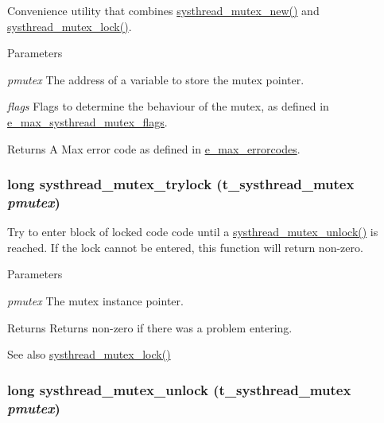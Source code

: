 Convenience utility that combines \hyperlink{group__mutex_gaa8cae78764c59883566ac4f861dd534e}{systhread\_\-mutex\_\-new()} and \hyperlink{group__mutex_ga6a3bea4c2f5e5d133d25d78b51fb15bf}{systhread\_\-mutex\_\-lock()}. 
\begin{DoxyParams}{Parameters}
\item[{\em pmutex}]The address of a variable to store the mutex pointer. \item[{\em flags}]Flags to determine the behaviour of the mutex, as defined in \hyperlink{group__threading_gaa95d9c538a1b25404d19106739db9802}{e\_\-max\_\-systhread\_\-mutex\_\-flags}. \end{DoxyParams}
\begin{DoxyReturn}{Returns}
A Max error code as defined in \hyperlink{group__misc_ga0764dd6c02b76cca7d053ae50555d69d}{e\_\-max\_\-errorcodes}. 
\end{DoxyReturn}
\hypertarget{group__mutex_gafa0cef91ad29e8e0625d35eadde52002}{
\subsubsection[{systhread\_\-mutex\_\-trylock}]{\setlength{\rightskip}{0pt plus 5cm}long systhread\_\-mutex\_\-trylock ({\bf t\_\-systhread\_\-mutex} {\em pmutex})}}
\label{group__mutex_gafa0cef91ad29e8e0625d35eadde52002}


Try to enter block of locked code code until a \hyperlink{group__mutex_ga74aae707e650844be8a4e51a217c9b5f}{systhread\_\-mutex\_\-unlock()} is reached. If the lock cannot be entered, this function will return non-\/zero.


\begin{DoxyParams}{Parameters}
\item[{\em pmutex}]The mutex instance pointer. \end{DoxyParams}
\begin{DoxyReturn}{Returns}
Returns non-\/zero if there was a problem entering. 
\end{DoxyReturn}
\begin{DoxySeeAlso}{See also}
\hyperlink{group__mutex_ga6a3bea4c2f5e5d133d25d78b51fb15bf}{systhread\_\-mutex\_\-lock()} 
\end{DoxySeeAlso}
\hypertarget{group__mutex_ga74aae707e650844be8a4e51a217c9b5f}{
\subsubsection[{systhread\_\-mutex\_\-unlock}]{\setlength{\rightskip}{0pt plus 5cm}long systhread\_\-mutex\_\-unlock ({\bf t\_\-systhread\_\-mutex} {\em pmutex})}}
\label{group__mutex_ga74aae707e650844be8a4e51a217c9b5f}


